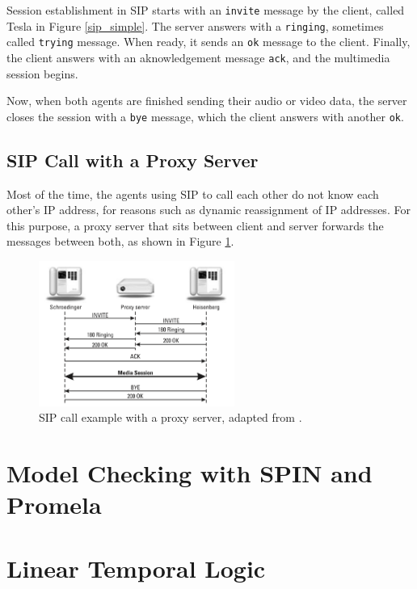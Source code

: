 \documentclass{article}
\begin{document}
Session establishment in SIP starts with an \texttt{invite} message by the client, called Tesla in
Figure \ref{sip_simple}. The server answers with a \texttt{ringing}, sometimes called \texttt{trying} message.
When ready, it sends an \texttt{ok} message to the client. Finally, the client answers with an aknowledgement
message \texttt{ack}, and the multimedia session begins. 

Now, when both agents are finished sending their audio or video data, the server closes the session with
a \texttt{bye} message, which the client answers with another \texttt{ok}.


\subsection{SIP Call with a Proxy Server}

Most of the time, the agents using SIP to call each other do not know each other's IP address, for reasons
such as dynamic reassignment of IP addresses. For this purpose, a proxy server that sits between client
and server forwards the messages between both, as shown in Figure \ref{sip_proxy}.

\begin{figure}[h]
\centering
\includegraphics[width=0.57\textwidth]{images/sip_proxy.png}
\caption{SIP call example with a proxy server, adapted from \citep[32]{sip}.}
\label{sip_proxy}
\end{figure}




\section{Model Checking with SPIN and Promela}


\section{Linear Temporal Logic}
\end{document}
